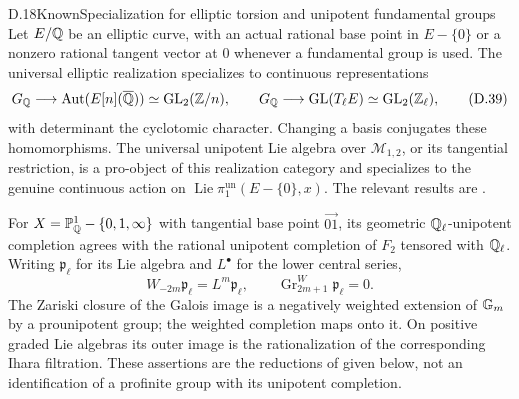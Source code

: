 \begin{statement}{D.18}{Known}{Specialization for elliptic torsion and unipotent fundamental groups}
Let \(E/\mathbb Q\) be an elliptic curve, with an actual rational
base point in \(E-\{0\}\) or a nonzero rational tangent
vector at \(0\) whenever a fundamental group is used.
The universal elliptic realization specializes to
continuous representations
\[
 G_\mathbb Q\longrightarrow\operatorname{Aut}(E[n](\overline{\mathbb Q}))
                     \simeq\operatorname{GL}_2(\mathbb Z/n),\qquad
 G_\mathbb Q\longrightarrow\operatorname{GL}(T_\ell E)\simeq\operatorname{GL}_2(\mathbb Z_\ell),
 \tag{D.39}
\]
with determinant the cyclotomic character.
Changing a basis conjugates these homomorphisms.
The universal unipotent Lie algebra over
\(\mathcal M_{1,2}\), or its tangential restriction, is a
pro-object of this realization category and specializes to
the genuine continuous action on
\(\operatorname{Lie}\pi_1^{\mathrm{un}}(E-\{0\},x)\).
The relevant results are
\citet[Example 6.6, Theorem 6.9, Corollary 6.10]{D_HainMatsumoto2020}.

For \(X=\mathbb P^1_\mathbb Q-\{0,1,\infty\}\) with tangential
base point \(\overrightarrow{01}\), its geometric
\(\mathbb Q_\ell\)-unipotent completion agrees with the rational
unipotent completion of \(F_2\) tensored with \(\mathbb Q_\ell\).
Writing \(\mathfrak p_\ell\) for its Lie algebra and
\(L^\bullet\) for the lower central series,
\[
 W_{-2m}\mathfrak p_\ell=L^m\mathfrak p_\ell,\qquad
 \operatorname{Gr}^{W}_{2m+1}\mathfrak p_\ell=0 .
 \tag{D.40}
\]
The Zariski closure of the Galois image is a negatively weighted extension of
\(\mathbb G_m\) by a prounipotent group; the weighted completion
maps onto it.  On positive graded Lie algebras its outer
image is the rationalization of the corresponding
Ihara filtration.
These assertions are the reductions of
\citet[Theorem A.6, Proposition 8.3, Theorem 8.4]{D_HainMatsumoto2001}
given below, not an identification of a profinite group
with its unipotent completion.
\end{statement}
